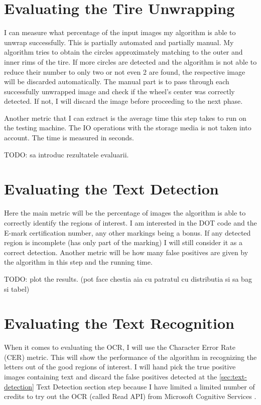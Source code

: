 \section{Evaluating the Tire Unwrapping}\label{section:evaluation-tire_unwrapping}

I can measure what percentage of the input images my algorithm is able to unwrap successfully. This is partially automated and partially manual. My algorithm tries to obtain the circles approximately matching to the outer and inner rims of the tire. If more circles are detected and the algorithm is not able to reduce their number to only two or not even 2 are found, the respective image will be discarded automatically. The manual part is to pass through each successfully unwrapped image and check if the wheel's center was correctly detected. If not, I will discard the image before proceeding to the next phase.

Another metric that I can extract is the average time this step takes to run on the testing machine. The IO operations with the storage media is not taken into account. The time is measured in seconds.

TODO: sa introduc rezultatele evaluarii.

\section{Evaluating the Text Detection}\label{section:evaluation-text_detection}

Here the main metric will be the percentage of images the algorithm is able to correctly identify the regions of interest. I am interested in the DOT code and the E-mark certification number, any other markings being a bonus. If any detected region is incomplete (has only part of the marking) I will still consider it as a correct detection. Another metric will be how many false positives are given by the algorithm in this step and the running time.

TODO: plot the results. (pot face chestia aia cu patratul cu distributia si sa bag si tabel)

\section{Evaluating the Text Recognition}\label{section:evaluation-ocr}

When it comes to evaluating the OCR, I will use the Character Error Rate (CER) \cite{site:evaluation-OCR-character_error_rate} metric. This will show the performance of the algorithm in recognizing the letters out of the good regions of interest. I will hand pick the true positive images containing text and discard the false positives detected at the \ref{sec:text-detection} Text Detection section step because I have limited a limited number of credits to try out the OCR (called Read API) from Microsoft Cognitive Services \cite{site:Microsoft_Cognitive_Services}.

